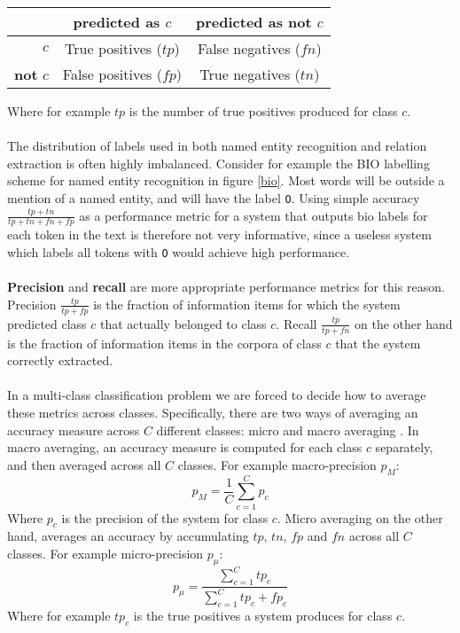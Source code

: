 \begin{center}
	\begin{tabular}{r | c c}
	 & \textbf{predicted as $c$} & \textbf{predicted as not $c$}  \\ \hline
	$c$ & True positives ($tp$) & False negatives ($fn$) \\
	\textbf{not} $c$ & False positives ($fp$) & True negatives ($tn$)
\end{tabular}
\end{center}
Where for example $tp$ is the number of true positives produced for class $c$.
\\\\
The distribution of labels used in both named entity recognition and relation extraction is often highly imbalanced. Consider for example the BIO labelling scheme for named entity recognition in figure \ref{bio}. Most words will be outside a mention of a named entity, and will have the label \texttt{O}. Using simple accuracy $\frac{tp + tn}{tp + tn + fn + fp}$ as a performance metric for a system that outputs bio labels for each token in the text is therefore not very informative, since a useless system which labels all tokens with \texttt{O} would achieve high performance.
\\\\
\textbf{Precision} and \textbf{recall} are more appropriate performance metrics for this reason. Precision $\frac{tp}{tp + fp}$ is the fraction of information items for which the system predicted class $c$ that actually belonged to class $c$.
Recall $\frac{tp}{tp + fn}$ on the other hand is the fraction of information items in the corpora of class $c$ that the system correctly extracted.
\\\\
In a multi-class classification problem we are forced to decide how to average these metrics across classes. Specifically, there are two ways of averaging an accuracy measure across $C$ different classes: micro and macro averaging \citep{sokolova2009}. In macro averaging, an accuracy measure is computed for each class $c$ separately, and then averaged across all $C$ classes. For example macro-precision $p_{M}$:
$$
p_{M} = \frac{1}{C}\sum_{c=1}^C p_c
$$
Where $p_c$ is the precision of the system for class $c$. Micro averaging on the other hand, averages an accuracy by accumulating $tp$, $tn$, $fp$ and $fn$ across all $C$ classes. For example micro-precision $p_{\mu}$:
$$
p_\mu = \frac{\sum\limits_{c=1}^C tp_c}{\sum\limits_{c=1}^C tp_c + fp_c}
$$
Where for example $tp_c$ is the true positives a system produces for class $c$.
